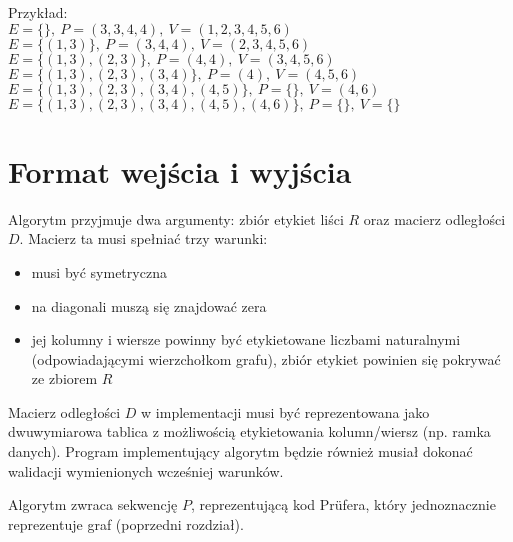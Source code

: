 \documentclass[a4paper,12p]{article}
\begin{document}
Przykład: \\
$E=\{\},~P=(3,3,4,4),~V=(1,2,3,4,5,6)$ \\
$E=\{(1,3)\},~P=(3,4,4),~V=(2,3,4,5,6)$ \\
$E=\{(1,3), (2,3)\},~P=(4,4),~V=(3,4,5,6)$ \\
$E=\{(1,3), (2,3), (3,4)\},~P=(4),~V=(4,5,6)$ \\
$E=\{(1,3), (2,3), (3,4), (4,5)\},~P=\{\},~V=(4,6)$ \\
$E=\{(1,3), (2,3), (3,4), (4,5), (4,6)\},~P=\{\},~V=\{\}$ \\


\newpage

\section{Format wejścia i wyjścia}

Algorytm przyjmuje dwa argumenty: zbiór etykiet liści $R$ oraz macierz odległości $D$. Macierz ta musi spełniać trzy warunki:

\begin{itemize}
	\item musi być symetryczna
	\item na diagonali muszą się znajdować zera
	\item jej kolumny i wiersze powinny być etykietowane liczbami naturalnymi (odpowiadającymi wierzchołkom grafu), zbiór etykiet powinien się pokrywać ze zbiorem $R$ 
\end{itemize}

Macierz odległości $D$ w implementacji musi być reprezentowana jako dwuwymiarowa tablica z możliwością etykietowania kolumn/wiersz (np. ramka danych). Program implementujący algorytm będzie również musiał dokonać walidacji wymienionych wcześniej warunków.

Algorytm zwraca sekwencję $P$, reprezentującą kod Prüfera, który jednoznacznie reprezentuje graf (poprzedni rozdział).
\end{document}
